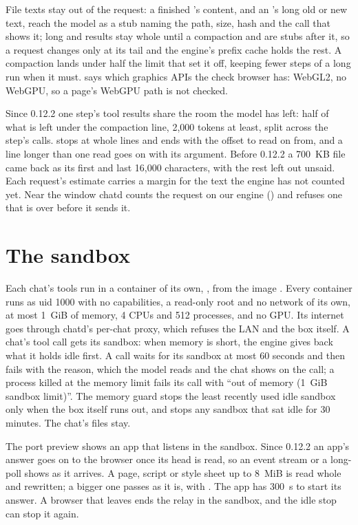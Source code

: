 File texts stay out of the request: a finished 's content, and an 's long old or new text, reach the model as a stub naming the path, size, hash and the  call that shows it; long  and  results stay whole until a compaction and are stubs after it, so a request changes only at its tail and the engine's prefix cache holds the rest. A compaction lands under half the limit that set it off, keeping fewer steps of a long run when it must.  says which graphics APIs the check browser has: WebGL2, no WebGPU, so a page's WebGPU path is not checked.

Since 0.12.2 one step's tool results share the room the model has left: half of what is left under the compaction line, 2{,}000 tokens at least, split across the step's calls.  stops at whole lines and ends with the offset to read on from, and a line longer than one read goes on with its  argument. Before 0.12.2 a 700~KB file came back as its first and last 16{,}000 characters, with the rest left out unsaid. Each request's estimate carries a margin for the text the engine has not counted yet. Near the window chatd counts the request on our engine () and refuses one that is over before it sends it.

\section{The sandbox}\label{sec:chat-sandbox}

Each chat's tools run in a container of its own, , from the image . Every container runs as uid 1000 with no capabilities, a read-only root and no network of its own, at most 1~GiB of memory, 4 CPUs and 512 processes, and no GPU. Its internet goes through chatd's per-chat proxy, which refuses the LAN and the box itself. A chat's tool call gets its sandbox: when memory is short, the engine gives back what it holds idle first. A call waits for its sandbox at most 60 seconds and then fails with the reason, which the model reads and the chat shows on the call; a process killed at the memory limit fails its call with ``out of memory (1~GiB sandbox limit)''. The memory guard stops the least recently used idle sandbox only when the box itself runs out, and stops any sandbox that sat idle for 30 minutes. The chat's files stay.

The port preview shows an app that listens in the sandbox. Since 0.12.2 an app's answer goes on to the browser once its head is read, so an event stream or a long-poll shows as it arrives. A page, script or style sheet up to 8~MiB is read whole and rewritten; a bigger one passes as it is, with . The app has 300~s to start its answer. A browser that leaves ends the relay in the sandbox, and the idle stop can stop it again.

